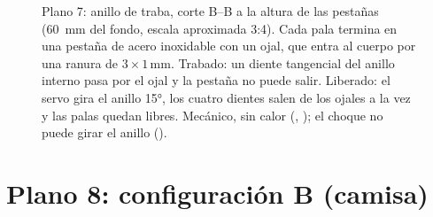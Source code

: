 \begin{figure}[H]
\caption{Plano 7: anillo de traba, corte B--B a la altura de las pestañas (\SI{60}{mm} del
fondo, escala aproximada 3:4). Cada pala termina en una pestaña de acero inoxidable con
un ojal, que entra al cuerpo por una ranura de $3\times1$\,mm. Trabado: un diente
tangencial del anillo interno pasa por el ojal y la pestaña no puede salir. Liberado: el
servo gira el anillo \ang{15}, los cuatro dientes salen de los ojales a la vez y las palas
quedan libres.
Mecánico, sin calor (, ); el choque no puede girar el anillo
().}
\label{fig:plano7}
\end{figure}

\section{Plano 8: configuración B (camisa)}

